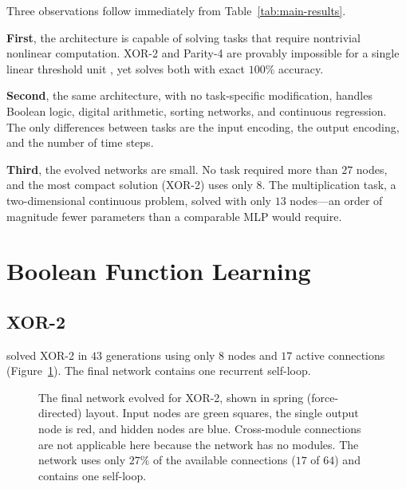 Three observations follow immediately from Table~\ref{tab:main-results}.

\textbf{First}, the architecture is capable of solving tasks that
require nontrivial nonlinear computation. XOR-2 and Parity-4 are
provably impossible for a single linear threshold unit
\citep{minsky1969perceptrons}, yet \modnet{} solves both with exact
$100\%$ accuracy.

\textbf{Second}, the same architecture, with no task-specific
modification, handles Boolean logic, digital arithmetic, sorting
networks, and continuous regression. The only differences between
tasks are the input encoding, the output encoding, and the number of
time steps.

\textbf{Third}, the evolved networks are small. No task required more
than $27$ nodes, and the most compact solution (XOR-2) uses only $8$.
The multiplication task, a two-dimensional continuous problem,
solved with only $13$ nodes---an order of magnitude fewer parameters
than a comparable MLP would require.

\section{Boolean Function Learning}
\label{sec:results-boolean}

\subsection{XOR-2}
\label{sec:results-xor2}

\modnet{} solved XOR-2 in $43$ generations using only $8$ nodes and
$17$ active connections (Figure~\ref{fig:xor2-spring}). The final
network contains one recurrent self-loop.

\begin{figure}[h]
  \centering
  \caption{The final network evolved for XOR-2, shown in spring
    (force-directed) layout. Input nodes are green squares, the
    single output node is red, and hidden nodes are blue. Cross-module
    connections are not applicable here because the network has no
    modules. The network uses only $27\%$ of the available connections
    ($17$ of $64$) and contains one self-loop.}
  \label{fig:xor2-spring}
\end{figure}

